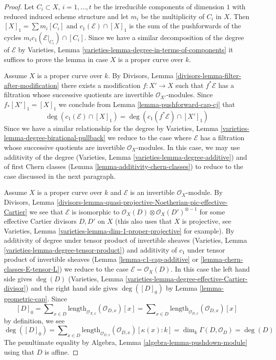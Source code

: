 \begin{proof}
Let $C_i \subset X$, $i = 1, \ldots, t$ be the irreducible components
of dimension $1$ with reduced induced scheme structure and let $m_i$ be the
multiplicity of $C_i$ in $X$. Then $[X]_1 = \sum m_i[C_i]$ and
$c_1(\mathcal{E}) \cap [X]_1$ is the sum of the pushforwards of the cycles
$m_i c_1(\mathcal{E}|_{C_i}) \cap [C_i]$. Since we have a similar decomposition
of the degree of $\mathcal{E}$ by
Varieties, Lemma \ref{varieties-lemma-degree-in-terms-of-components}
it suffices to prove the lemma in case $X$ is a proper curve over $k$.

\medskip\noindent
Assume $X$ is a proper curve over $k$.
By Divisors, Lemma \ref{divisors-lemma-filter-after-modification}
there exists a modification $f : X' \to X$ such that $f^*\mathcal{E}$
has a filtration whose successive quotients are invertible
$\mathcal{O}_{X'}$-modules. Since $f_*[X']_1 = [X]_1$ we conclude
from Lemma \ref{lemma-pushforward-cap-cj} that
$$
\deg(c_1(\mathcal{E}) \cap [X]_1) = \deg(c_1(f^*\mathcal{E}) \cap [X']_1)
$$
Since we have a similar relationship for the degree by
Varieties, Lemma \ref{varieties-lemma-degree-birational-pullback}
we reduce to the case where $\mathcal{E}$ has a filtration whose
successive quotients are invertible $\mathcal{O}_X$-modules.
In this case, we may use additivity of the degree
(Varieties, Lemma \ref{varieties-lemma-degree-additive})
and of first Chern classes (Lemma \ref{lemma-additivity-chern-classes})
to reduce to the case discussed in the next paragraph.

\medskip\noindent
Assume $X$ is a proper curve over $k$ and $\mathcal{E}$ is an
invertible $\mathcal{O}_X$-module. By
Divisors, Lemma
\ref{divisors-lemma-quasi-projective-Noetherian-pic-effective-Cartier}
we see that $\mathcal{E}$ is isomorphic to
$\mathcal{O}_X(D) \otimes \mathcal{O}_X(D')^{\otimes -1}$
for some effective Cartier divisors $D, D'$ on $X$ (this also uses
that $X$ is projective, see
Varieties, Lemma \ref{varieties-lemma-dim-1-proper-projective} for example).
By additivity of degree under tensor product of invertible sheaves
(Varieties, Lemma \ref{varieties-lemma-degree-tensor-product})
and additivity of $c_1$ under tensor product of invertible sheaves
(Lemma \ref{lemma-c1-cap-additive} or \ref{lemma-chern-classes-E-tensor-L})
we reduce to the case $\mathcal{E} = \mathcal{O}_X(D)$.
In this case the left hand side gives $\deg(D)$
(Varieties, Lemma \ref{varieties-lemma-degree-effective-Cartier-divisor})
and the right hand side gives $\deg([D]_0)$ by
Lemma \ref{lemma-geometric-cap}.
Since
$$
[D]_0 = \sum\nolimits_{x \in D}
\text{length}_{\mathcal{O}_{X, x}}(\mathcal{O}_{D, x}) [x] =
\sum\nolimits_{x \in D}
\text{length}_{\mathcal{O}_{D, x}}(\mathcal{O}_{D, x}) [x]
$$
by definition, we see
$$
\deg([D]_0) = \sum\nolimits_{x \in D}
\text{length}_{\mathcal{O}_{D, x}}(\mathcal{O}_{D, x}) [\kappa(x) : k] =
\dim_k \Gamma(D, \mathcal{O}_D) = \deg(D)
$$
The penultimate equality by
Algebra, Lemma \ref{algebra-lemma-pushdown-module}
using that $D$ is affine.
\end{proof}

